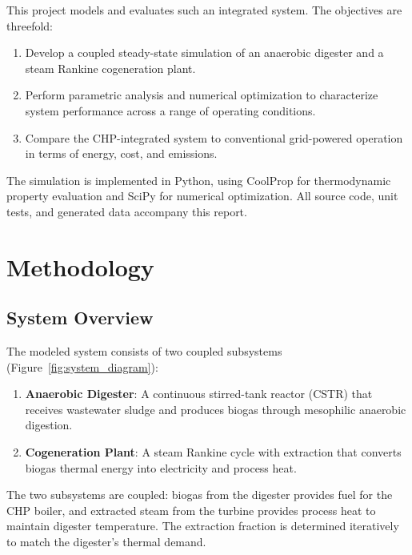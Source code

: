 \documentclass[12pt, letterpaper]{article}
\begin{document}
This project models and evaluates such an integrated system. The objectives are threefold:
\begin{enumerate}[noitemsep]
  \item Develop a coupled steady-state simulation of an anaerobic digester and a steam Rankine cogeneration plant.
  \item Perform parametric analysis and numerical optimization to characterize system performance across a range of operating conditions.
  \item Compare the CHP-integrated system to conventional grid-powered operation in terms of energy, cost, and emissions.
\end{enumerate}

The simulation is implemented in Python, using CoolProp for thermodynamic property evaluation and SciPy for numerical optimization. All source code, unit tests, and generated data accompany this report.

\section{Methodology}

\subsection{System Overview}

The modeled system consists of two coupled subsystems (Figure~\ref{fig:system_diagram}):
\begin{enumerate}[noitemsep]
  \item \textbf{Anaerobic Digester}: A continuous stirred-tank reactor (CSTR) that receives wastewater sludge and produces biogas through mesophilic anaerobic digestion.
  \item \textbf{Cogeneration Plant}: A steam Rankine cycle with extraction that converts biogas thermal energy into electricity and process heat.
\end{enumerate}

The two subsystems are coupled: biogas from the digester provides fuel for the CHP boiler, and extracted steam from the turbine provides process heat to maintain digester temperature. The extraction fraction is determined iteratively to match the digester's thermal demand.
\end{document}
